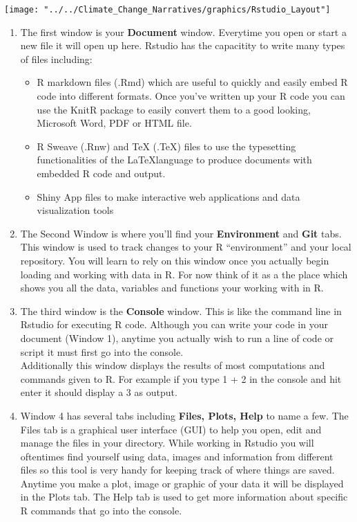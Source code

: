\documentclass{article}\usepackage[]{graphicx}\usepackage[]{color}
\begin{document}
\texttt{[image: "../../Climate\_Change\_Narratives/graphics/Rstudio\_Layout"]}
  \begin{enumerate}
  \item The first window is your \textbf{Document} window. Everytime you open or start a new file it will open up here. Rstudio has the capacitity to write many types of files including: 
  \begin{itemize}
  \item R markdown files (.Rmd) which are useful to quickly and easily embed R code into different formats. Once you've written up your R code you can use the KnitR package to easily convert them to a good looking, Microsoft Word, PDF or HTML file. 
  \item R Sweave (.Rnw) and TeX (.TeX) files to use the typesetting functionalities of the \LaTeX language to produce documents with embedded R code and output. 
  \item Shiny App files to make interactive web applications and data visualization tools
  \end{itemize}
  \item The Second Window is where you'll find your \textbf{Environment} and \textbf{Git} tabs. This window is used to track changes to your R ``environment'' and your local repository. You will learn to rely on this window once you actually begin loading and working with data in R. For now think of it as a the place which shows you all the data, variables and functions your working with in R. 
  \item The third window is the \textbf{Console} window. This is like the command line in Rstudio for executing R code. Although you can write your code in your document (Window 1), anytime you actually wish to run a line of code or script it must first go into the console.\\
  Additionally this window displays the results of most computations and commands given to R. For example if you type 1 + 2 in the console and hit enter it should display a 3 as output.   
  \item Window 4 has several tabs including \textbf{Files, Plots, Help} to name a few. The Files tab is a graphical user interface (GUI) to help you open, edit and manage the files in your directory. While working in Rstudio you will oftentimes find yourself using data, images and information from different files so this tool is very handy for keeping track of where things are saved. \\
  Anytime you make a plot, image or graphic of your data it will be displayed in the Plots tab. The Help tab is used to get more information about specific R commands that go into the console. \\
  \end{enumerate}
  
\end{document}

